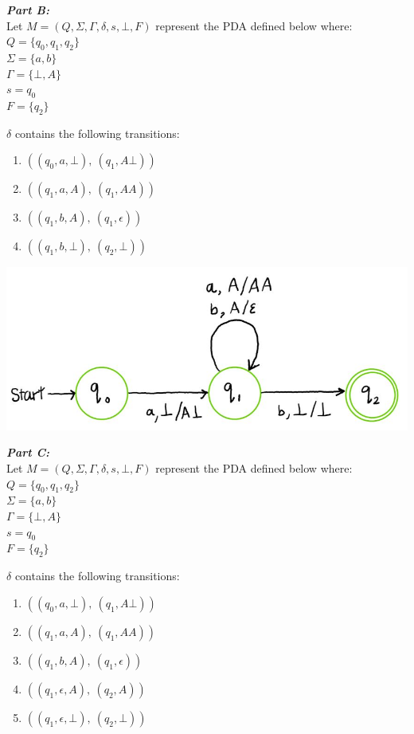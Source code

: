 \documentclass[11pt,fleqn]{article}
\newcommand{\be}{\begin{enumerate}}
\newcommand{\ee}{\end{enumerate}}
\newcommand{\set}[1]{{\{ #1 \}}}
\begin{document}
	\noindent\textbf{\emph{Part B:}}\\
	Let $M = (Q, \Sigma, \Gamma, \delta, s, \bot, F)$ represent the PDA defined below where:\\
	$Q = \set{q_0, q_1, q_2}$\\
	$\Sigma = \set{a, b}$\\
	$\Gamma = \set{\bot, A}$\\
	$s = q_0$\\
	$F = \set{q_2}$

	\noindent$\delta$ contains the following transitions:
	\be
	\item $((q_0, a, \bot),\ (q_1, A\bot))$
	\item $((q_1, a, A),\ (q_1, AA))$
	\item $((q_1, b, A),\ (q_1, \epsilon))$
	\item $((q_1, b, \bot),\ (q_2, \bot))$
	\ee

	\begin{center}
	\includegraphics[scale = 0.5]{A8partB.JPG}
	\end{center}

	\noindent\textbf{\emph{Part C:}}\\
	Let $M = (Q, \Sigma, \Gamma, \delta, s, \bot, F)$ represent the PDA defined below where:\\
	$Q = \set{q_0, q_1, q_2}$\\
	$\Sigma = \set{a, b}$\\
	$\Gamma = \set{\bot, A}$\\
	$s = q_0$\\
	$F = \set{q_2}$

	\noindent$\delta$ contains the following transitions:
	\be
	\item $((q_0, a, \bot),\ (q_1, A\bot))$
	\item $((q_1, a, A),\ (q_1, AA))$
	\item $((q_1, b, A),\ (q_1, \epsilon))$
	\item $((q_1, \epsilon, A),\ (q_2, A))$
	\item $((q_1, \epsilon, \bot),\ (q_2, \bot))$
	\ee
\end{document}
